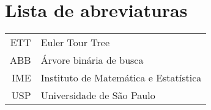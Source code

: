 \documentclass[12pt,twoside,english,brazilian]{book}
\begin{document}
\makeatletter
\if@openright\cleardoublepage\else\clearpage\fi
\makeatother


\newcommand\disablenewpage[1]{{\let\clearpage\par\let\cleardoublepage\par #1}}

\bgroup
\raggedbottom


\disablenewpage{\chapter*{Lista de abreviaturas}}

\begin{tabular}{rl}
   ETT & Euler Tour Tree\\
   ABB & Árvore binária de busca\\
   IME & Instituto de Matemática e Estatística\\
   USP & Universidade de São Paulo
\end{tabular}
\end{document}
